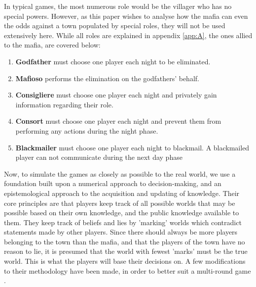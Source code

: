 In typical games, the most numerous role would be the villager who has no
special powers. However, as this paper wishes to analyse how the mafia can even
the odds against a town populated by special roles, they will not be used
extensively here. While all roles are explained in appendix \ref{app:A}, the
ones allied to the mafia, are covered below:

\begin{enumerate}
	\itemsep0px
	\item\textbf{Godfather} must choose one player each night to be eliminated.
	\item\textbf{Mafioso} performs the elimination on the godfathers' behalf. 
	\item\textbf{Consigliere} must choose one player each night and privately
	      gain information regarding their role.
	\item\textbf{Consort} must choose one player each night and prevent them
	      from performing any actions during the night phase.
	\item\textbf{Blackmailer} must choose one player each night to blackmail. A
	      blackmailed player can not communicate during the next day phase
	      \label{lst:Roles}
\end{enumerate}

Now, to simulate the games as closely as possible to the real world, we use a
foundation built upon a numerical approach to decision-making, and an
epistemological approach to the acquisition and updating of
knowledge\cite{commitment}. Their core principles are that players keep track
of all possible worlds that may be possible based on their own knowledge, and
the public knowledge available to them. They keep track of beliefs and lies by
'marking' worlds which contradict statements made by other players. Since there
should always be more players belonging to the town than the mafia, and that
the players of the town have no reason to lie, it is presumed that the world
with fewest 'marks' must be the true world. This is what the players will base
their decisions on. A few modifications to their methodology have been made, in
order to better suit a multi-round game \cite{commitment}.

